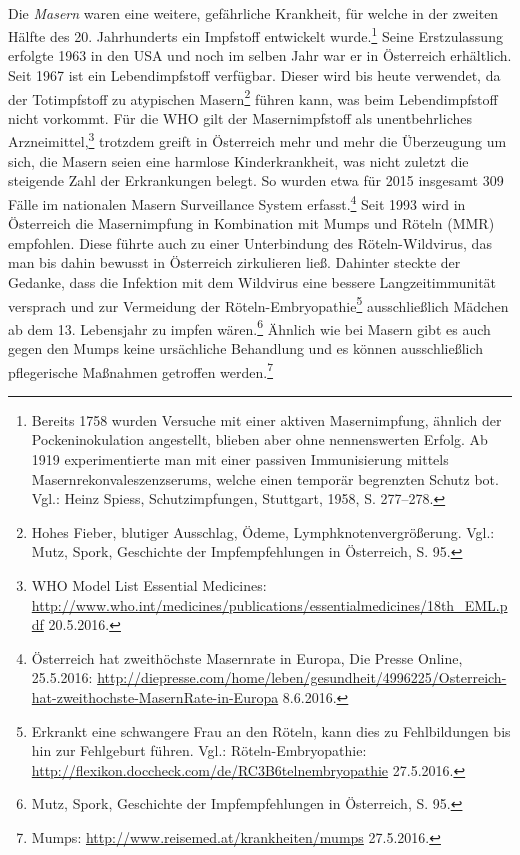 \documentclass[
    a4paper,
    12pt,
    hyphens,
    chapterprefix=true,
    headheight=33pt,
    footheight=29pt,
    headings=optiontohead, %
]{scrartcl}
\begin{document}
\\
Die \textit{Masern} waren eine weitere, gefährliche Krankheit, für welche in der zweiten Hälfte des 20. Jahrhunderts ein Impfstoff entwickelt 
wurde.\footnote{Bereits 1758 wurden Versuche mit einer aktiven Masernimpfung, ähnlich der Pockeninokulation angestellt, blieben aber ohne nennenswerten Erfolg. Ab 1919 experimentierte man mit einer passiven Immunisierung mittels Masernrekonvaleszenzserums, welche einen temporär begrenzten Schutz bot. Vgl.: Heinz Spiess, Schutzimpfungen, Stuttgart, 1958, S. 277--278.} Seine Erstzulassung erfolgte 1963 in den USA und noch im selben Jahr war er in Österreich erhältlich. Seit 1967 ist ein 
Lebendimpfstoff verfügbar. Dieser wird bis heute verwendet, da der Totimpfstoff 
zu atypischen Masern\footnote{Hohes Fieber, blutiger Ausschlag, Ödeme, Lymphknotenvergrößerung. Vgl.: Mutz, Spork, Geschichte 
der Impfempfehlungen in Österreich, S. 95.} führen kann, was beim Lebendimpfstoff nicht vorkommt. Für die WHO gilt der Masernimpfstoff als unentbehrliches Arzneimittel,\footnote{WHO Model List Essential Medicines: \url{http://www.who.int/medicines/publications/essentialmedicines/18th_EML.pdf} 20.5.2016.}
trotzdem greift in Österreich mehr und mehr die Überzeugung um sich, die Masern seien eine harmlose Kinderkrankheit, was nicht 
zuletzt die steigende Zahl der Erkrankungen belegt. So wurden etwa für 2015 insgesamt 309 Fälle im nationalen Masern Surveillance 
System erfasst.\footnote{Österreich hat zweithöchste Masernrate in Europa, Die Presse Online, 25.5.2016: 
\url{http://diepresse.com/home/leben/gesundheit/4996225/Osterreich-hat-zweithochste-MasernRate-in-Europa} 8.6.2016.} 
Seit 1993 wird in Österreich die Masernimpfung in Kombination mit Mumps und Röteln (MMR) empfohlen. Diese 
führte auch zu einer Unterbindung des Röteln-Wildvirus, das man bis dahin bewusst in Österreich zirkulieren ließ. 
Dahinter steckte der Gedanke, dass die Infektion mit dem Wildvirus eine bessere Langzeitimmunität versprach und zur Vermeidung der 
Röteln-Embryopathie\footnote{Erkrankt eine schwangere Frau an den Röteln, kann dies zu Fehlbildungen bis hin zur Fehlgeburt führen. 
Vgl.: Röteln-Embryopathie: \url{http://flexikon.doccheck.com/de/RC3B6telnembryopathie} 27.5.2016.} ausschließlich Mädchen 
ab dem 13. Lebensjahr zu impfen wären.\footnote{Mutz, Spork, Geschichte der Impfempfehlungen in Österreich, S. 95.} 
Ähnlich wie bei Masern gibt es auch gegen den Mumps keine ursächliche Behandlung und es können ausschließlich 
pflegerische Maßnahmen getroffen werden.\footnote{Mumps: \url{http://www.reisemed.at/krankheiten/mumps} 27.5.2016.}\\
\end{document}
